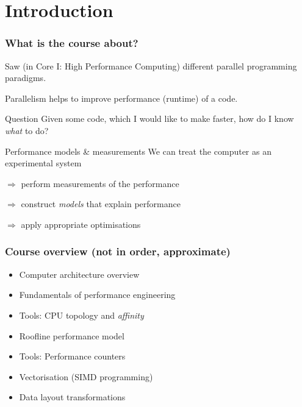 \documentclass[presentation,aspectratio=43,10pt]{beamer}
\date{}
\begin{document}
\begin{frame}
  \maketitle
\end{frame}

\section{Introduction}

\begin{frame}
  \frametitle{What is the course about?}

  Saw (in Core I: High Performance Computing) different parallel
  programming paradigms.

  Parallelism helps to improve performance (runtime) of a code.

  \begin{challenge}{Question}
    Given some code, which I would like to make faster, how do I know
    \emph{what} to do?
  \end{challenge}
  \pause
  \begin{answer}{Performance models \& measurements}
    We can treat the computer as an experimental system

    $\Rightarrow$ perform measurements of the performance

    $\Rightarrow$ construct \emph{models} that explain performance

    $\Rightarrow$ apply appropriate optimisations
  \end{answer}
\end{frame}

\begin{frame}
  \frametitle{Course overview (not in order, approximate)}
  \begin{itemize}
  \item Computer architecture overview
  \item Fundamentals of performance engineering
  \item Tools: CPU topology and \emph{affinity}
  \item Roofline performance model
  \item Tools: Performance counters
  \item Vectorisation (SIMD programming)
  \item Data layout transformations
  \end{itemize}
\end{frame}
\end{document}
